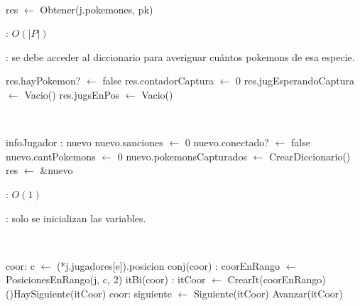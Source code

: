 \begin{Algoritmos}
	~

	\begin{algorithm}[H]
		\NoCaptionOfAlgo
		\caption{}
		res $\leftarrow$ Obtener(j.pokemones, pk)
	\end{algorithm}

	\complejidad: $O(|P|)$

	\justifcomp: se debe acceder al diccionario para averiguar cuántos pokemons de esa especie.



	\begin{algorithm}[H]
		\NoCaptionOfAlgo
		\caption{}
		\BlankLine
		res.hayPokemon? $\leftarrow$ false
		res.contadorCaptura $\leftarrow$ 0
		res.jugEsperandoCaptura $\leftarrow$ Vacio()
		res.jugsEnPos $\leftarrow$ Vacio()
	\end{algorithm}
	
	~

	\begin{algorithm}[H]
		\NoCaptionOfAlgo
		\caption{}
		\BlankLine
		infoJugador : nuevo
		nuevo.sanciones $\leftarrow$ 0
		nuevo.conectado? $\leftarrow$ false
		nuevo.cantPokemons $\leftarrow$ 0
		nuevo.pokemonsCapturados $\leftarrow$ CrearDiccionario()
		res $\leftarrow$ \&nuevo
	\end{algorithm}

	\complejidad: $O(1)$

	\justifcomp: solo se inicializan las variables.

	~

	\begin{algorithm}[H]
		\NoCaptionOfAlgo
		\caption{}
		\BlankLine
		coor: c $\leftarrow$ (*j.jugadores[e]).posicion
		conj(coor) : coorEnRango $\leftarrow$ PosicionesEnRango(j, c, 2)
		itBi(coor) : itCoor $\leftarrow$ CrearIt(coorEnRango)
		\While(){HaySiguiente(itCoor)}{
			coor: siguiente $\leftarrow$ Siguiente(itCoor)
			Avanzar(itCoor)
		}
	\end{algorithm}


\end{Algoritmos}

